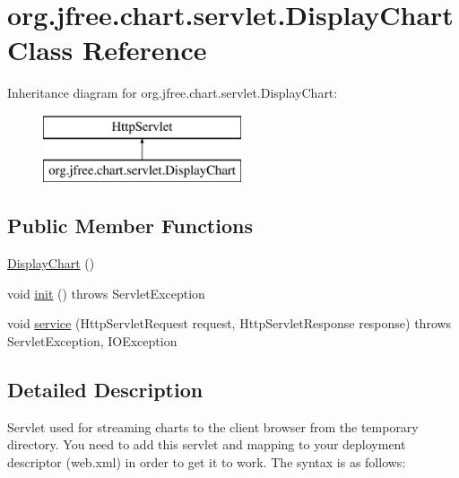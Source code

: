 \hypertarget{classorg_1_1jfree_1_1chart_1_1servlet_1_1_display_chart}{}\section{org.\+jfree.\+chart.\+servlet.\+Display\+Chart Class Reference}
\label{classorg_1_1jfree_1_1chart_1_1servlet_1_1_display_chart}
Inheritance diagram for org.\+jfree.\+chart.\+servlet.\+Display\+Chart\+:\begin{figure}[H]
\begin{center}
\leavevmode
\includegraphics[height=2.000000cm]{classorg_1_1jfree_1_1chart_1_1servlet_1_1_display_chart}
\end{center}
\end{figure}
\subsection*{Public Member Functions}
\begin{DoxyCompactItemize}
\item 
\mbox{\hyperlink{classorg_1_1jfree_1_1chart_1_1servlet_1_1_display_chart_aaf3c909080ec6f755edac69a9b20f157}{Display\+Chart}} ()
\item 
void \mbox{\hyperlink{classorg_1_1jfree_1_1chart_1_1servlet_1_1_display_chart_ab825c900255fc58e4d1912118a27a131}{init}} ()  throws Servlet\+Exception 
\item 
void \mbox{\hyperlink{classorg_1_1jfree_1_1chart_1_1servlet_1_1_display_chart_a0fdd8b42c8723cb20f14a0ba4231309c}{service}} (Http\+Servlet\+Request request, Http\+Servlet\+Response response)  throws Servlet\+Exception, I\+O\+Exception 
\end{DoxyCompactItemize}


\subsection{Detailed Description}
Servlet used for streaming charts to the client browser from the temporary directory. You need to add this servlet and mapping to your deployment descriptor (web.\+xml) in order to get it to work. The syntax is as follows\+:

